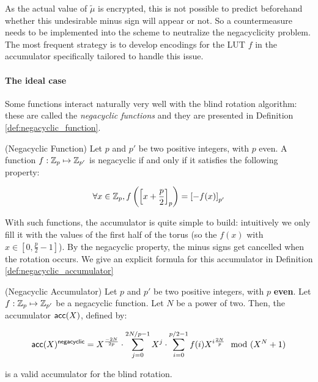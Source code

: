 As the actual value of $\tilde{\mu}$ is encrypted, this is not possible to predict beforehand whether this undesirable minus sign will appear or not. So a countermeasure needs to be implemented into the scheme to neutralize the negacyclicity problem. The most frequent strategy is to develop encodings for the LUT $f$ in the accumulator specifically tailored to handle this issue.


\paragraph{The ideal case}

Some functions interact naturally very well with the blind rotation algorithm: these are called the \textit{negacyclic functions} and they are presented in Definition \ref{def:negacyclic_function}.


\begin{definition} (Negacyclic Function)
	Let $p$ and $p'$ be two positive integers, with $p$ even. A function $f : \mathbb{Z}_p \mapsto \mathbb{Z}_{p'}$ is negacyclic if and only if it satisfies the following property:
	
	\[
		\forall x \in \mathbb{Z}_p, f\left (\left [ x + \frac p 2 \right ]_{p} \right ) = \left [ -f(x) \right ]_{p'}
	\]
	
	\label{def:negacyclic_function}
\end{definition}


With such functions, the accumulator is quite simple to build: intuitively we only fill it with the values of the first half of the torus (so the $f(x)$ with $x \in \left [0, \frac p 2 - 1 \right ]$). By the negacyclic property, the minus signs get cancelled when the rotation occurs. We give an explicit formula for this accumulator in Definition \ref{def:negacyclic_accumulator}

\begin{definition} (Negacyclic Accumulator)
		\label{def:negacyclic_accumulator}
		Let $p$ and $p'$ be two positive integers, with $p$ \textbf{even}. Let $f:\mathbb{Z}_p \mapsto \mathbb{Z}_{p'}$ be a negacyclic function. Let $N$ be a power of two. Then, the accumulator $\textsf{acc}(X)$, defined by:
	
	\[
		\textsf{acc}(X)^{\textsf{negacyclic}} = X^{\frac{-2N}{2p}} \cdot \sum_{j=0}^{2N / p - 1} X^j \cdot \sum_{i=0}^{p/2 - 1} f(i) X^{i \frac{2N}{p}} \mod (X^N + 1)
	\]
	
	is a valid accumulator for the blind rotation.

\end{definition}

